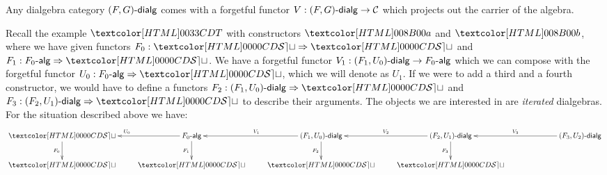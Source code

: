 \begin{remark}
  Any dialgebra category $\dialgcat{F}{G}$ comes with a forgetful
  functor $V : \dialgcat{F}{G} \to \Cc$ which projects out the carrier
  of the algebra.
\end{remark}

Recall the example $\Tty$ with constructors $\Ta$ and $\Tb$, where we
have given functors $F_0 : \Func{\SET}{\SET}$ and
$F_1 : \Func{\algcat{F_0}}{\SET}$. We have a forgetful functor
$V_1 : \dialgcat{F_1}{U_0} \to \algcat{F_0}$ which we can compose with
the forgetful functor $U_0 : \Func{\algcat{F_0}}{\SET}$, which we will
denote as $U_1$. If we were to add a third and a fourth constructor,
we would have to define a functors
$F_2 : \Func{\dialgcat{F_1}{U_0}}{\SET}$ and
$F_3 : \Func{\dialgcat{F_2}{U_1}}{\SET}$ to describe their
arguments. The objects we are interested in are \emph{iterated}
dialgebras. For the situation described above we have:
$$
\xymatrix@!C{
\SET 
\ar[d]_{F_0}
&\algcat{F_0} 
\ar[d]_{F_1}
\ar[l]_{U_0}
&\dialgcat{F_1}{U_0}
\ar[d]_{F_2}
\ar[l]_{V_1}
&\dialgcat{F_2}{U_1}
\ar[d]_{F_3}
\ar[l]_{V_2}
&\dialgcat{F_3}{U_2}
\ar[l]_{V_3}
\\
\SET
&\SET
&\SET
&\SET
&
}
$$

